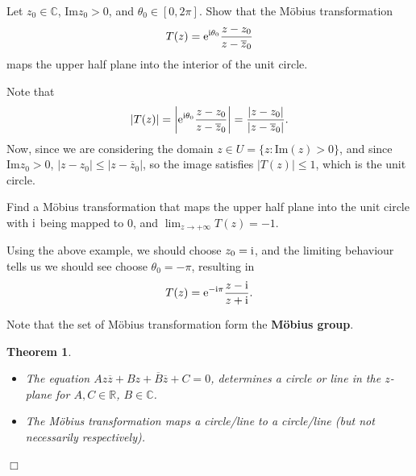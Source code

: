 \documentclass[letter-paper]{tufte-book}
\newtheorem{theorem}{\color{pastel-blue}Theorem}[section]
\newenvironment{example}[1][Example]{\begin{trivlist}
\item[\hskip \labelsep {\bfseries #1}]}{\end{trivlist}}
\newcommand{\ex}{\mathrm{e}}
\newcommand{\zi}{{\rm i}}
\newcommand{\qedwhite}{\hfill \ensuremath{\Box}}
\begin{document}
\begin{example}
  Let $z_0 \in \mathbb{C}$, $\mbox{Im} z_0 > 0$, and $\theta_0 \in [0, 2\pi]$.
  Show that the M\"obius transformation
  \begin{equation*}
    T(z) = \ex^{\zi \theta_0} \frac{z-z_0}{z - \overline{z}_0}
  \end{equation*}
  maps the upper half plane into the interior of the unit circle.
  
  Note that
  \begin{equation*}
    |T(z)| = \left|\ex^{\zi \theta_0} \frac{z-z_0}{z - \overline{z}_0}\right| = \frac{|z-z_0|}{|z - \overline{z}_0|}.
  \end{equation*}
  Now, since we are considering the domain $z \in U = \{z : \mbox{Im}(z) > 0\}$,
  and since $\mbox{Im}z_0 > 0$, $|z - z_0| \leq |z - \overline{z}_0|$, so the
  image satisfies $|T(z)| \leq 1$, which is the unit circle.
\end{example}

\begin{example}
  Find a M\"obius transformation that maps the upper half plane into the unit
  circle with $\zi$ being mapped to $0$, and $\lim_{z\to+\infty} T(z) = -1$.
  
  Using the above example, we should choose $z_0 = \zi$, and the limiting
  behaviour tells us we should see choose $\theta_0 = -\pi$, resulting in
  \begin{equation*}
    T(z) = \ex^{-\zi\pi} \frac{z-\zi}{z+\zi}.
  \end{equation*}
\end{example}

Note that the set of M\"obius transformation form the \textbf{M\"obius
group}.

\begin{theorem}
  \begin{itemize}
    \item The equation $Az\overline{z} + Bz + \overline{B}\overline{z} + C = 0$,
    determines a circle or line in the $z$-plane for $A, C \in \mathbb{R}$, $B
    \in \mathbb{C}$.
    
    \item The M\"obius transformation maps a circle/line to a circle/line (but
    not necessarily respectively).
  \end{itemize}

\qedwhite

\end{theorem}
\end{document}
